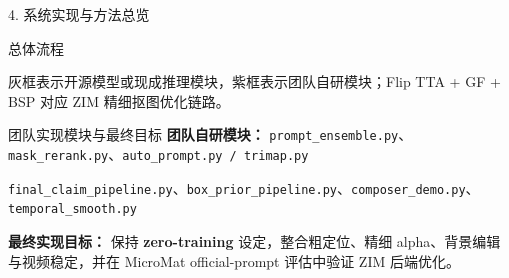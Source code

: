 \documentclass[aspectratio=169]{beamer}
\newcommand{\hilite}[1]{\textcolor{nankai}{\textbf{#1}}}
\begin{document}
\begin{frame}[t]{4. 系统实现与方法总览}
\begin{block}{总体流程}
{}

    \vspace{0.15em}
    {\scriptsize 灰框表示开源模型或现成推理模块，紫框表示团队自研模块；Flip TTA + GF + BSP 对应 ZIM 精细抠图优化链路。}
  \end{block}

  \vspace{-0.3em}
  \begin{block}{团队实现模块与最终目标}
    \scriptsize
    \textbf{团队自研模块：}
    \texttt{prompt\_ensemble.py}、\texttt{mask\_rerank.py}、\texttt{auto\_prompt.py / trimap.py}

    \texttt{final\_claim\_pipeline.py}、\texttt{box\_prior\_pipeline.py}、\texttt{composer\_demo.py}、\texttt{temporal\_smooth.py}

    \vspace{0.05em}
    \textbf{最终实现目标：}
    保持 \hilite{zero-training} 设定，整合粗定位、精细 alpha、背景编辑与视频稳定，并在 MicroMat official-prompt 评估中验证 ZIM 后端优化。
  \end{block}
\end{frame}


\end{document}
